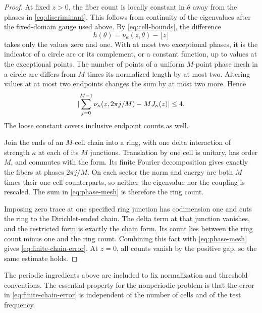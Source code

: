 \begin{proof}
At fixed $z>0$, the fiber count is locally constant in $\theta$
away from the phases in \eqref{eq:discriminant}. This follows
from continuity of the eigenvalues after the fixed-domain gauge
used above. By \eqref{eq:cell-bounds}, the difference
\[
 h(\theta)=\nu_\kappa(z,\theta)-\lfloor z\rfloor
\]
takes only the values zero and one. With at most two exceptional
phases, it is the indicator of a circle arc or its complement,
or a constant function, up to values at the exceptional points.
The number of points of a uniform $M$-point phase mesh in a
circle arc differs from $M$ times its normalized length by at
most two. Altering values at at most two endpoints changes the
sum by at most two more. Hence
\begin{equation}
 \lvert\sum_{j=0}^{M-1}\nu_\kappa(z,2\pi j/M)
                              -M J_\kappa(z)\rvert\le4.
 \label{eq:phase-mesh}
\end{equation}
The loose constant covers inclusive endpoint counts as well.

Join the ends of an $M$-cell chain into a ring, with one delta
interaction of strength $\kappa$ at each of its $M$ junctions.
Translation by one cell is unitary, has order $M$, and commutes
with the form. Its finite Fourier decomposition gives exactly
the fibers at phases $2\pi j/M$. On each sector the norm and
energy are both $M$ times their one-cell counterparts, so
neither the eigenvalue nor the coupling is rescaled.
The sum in \eqref{eq:phase-mesh} is therefore the ring count.

Imposing zero trace at one specified ring junction has
codimension one and cuts the ring to the Dirichlet-ended
chain. The delta term at that junction vanishes, and the
restricted form is exactly the chain form. Its count lies
between the ring count minus one and the ring count.
Combining this fact with \eqref{eq:phase-mesh} gives
\eqref{eq:finite-chain-error}. At $z=0$, all counts vanish
by the positive gap, so the same estimate holds.
\end{proof}

The periodic ingredients above are included to fix normalization
and threshold conventions. The essential property for the
nonperiodic problem is that the error in
\eqref{eq:finite-chain-error} is independent of the number of
cells and of the test frequency.
